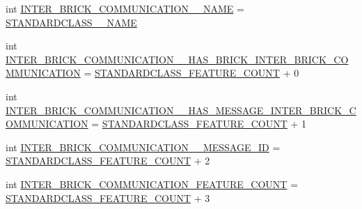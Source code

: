 \begin{DoxyCompactItemize}
\item 
int \hyperlink{interfaceshootingmachineemfmodel_1_1_shootingmachineemfmodel_package_abb5392d911aa5f7d4a788a7d7526f30b}{I\-N\-T\-E\-R\-\_\-\-B\-R\-I\-C\-K\-\_\-\-C\-O\-M\-M\-U\-N\-I\-C\-A\-T\-I\-O\-N\-\_\-\-\_\-\-N\-A\-M\-E} = \hyperlink{interfaceshootingmachineemfmodel_1_1_shootingmachineemfmodel_package_a06475d7d54d52ee19b2aaf4d5d73c738}{S\-T\-A\-N\-D\-A\-R\-D\-C\-L\-A\-S\-S\-\_\-\-\_\-\-N\-A\-M\-E}
\item 
int \hyperlink{interfaceshootingmachineemfmodel_1_1_shootingmachineemfmodel_package_a4c6fd564dd4ba2568a585c6dc93b72fc}{I\-N\-T\-E\-R\-\_\-\-B\-R\-I\-C\-K\-\_\-\-C\-O\-M\-M\-U\-N\-I\-C\-A\-T\-I\-O\-N\-\_\-\-\_\-\-H\-A\-S\-\_\-\-B\-R\-I\-C\-K\-\_\-\-I\-N\-T\-E\-R\-\_\-\-B\-R\-I\-C\-K\-\_\-\-C\-O\-M\-M\-U\-N\-I\-C\-A\-T\-I\-O\-N} = \hyperlink{interfaceshootingmachineemfmodel_1_1_shootingmachineemfmodel_package_a14037f66989b3107e402142df96ee9aa}{S\-T\-A\-N\-D\-A\-R\-D\-C\-L\-A\-S\-S\-\_\-\-F\-E\-A\-T\-U\-R\-E\-\_\-\-C\-O\-U\-N\-T} + 0
\item 
int \hyperlink{interfaceshootingmachineemfmodel_1_1_shootingmachineemfmodel_package_a573780dee8497e6d6e4aa6401c1e36fb}{I\-N\-T\-E\-R\-\_\-\-B\-R\-I\-C\-K\-\_\-\-C\-O\-M\-M\-U\-N\-I\-C\-A\-T\-I\-O\-N\-\_\-\-\_\-\-H\-A\-S\-\_\-\-M\-E\-S\-S\-A\-G\-E\-\_\-\-I\-N\-T\-E\-R\-\_\-\-B\-R\-I\-C\-K\-\_\-\-C\-O\-M\-M\-U\-N\-I\-C\-A\-T\-I\-O\-N} = \hyperlink{interfaceshootingmachineemfmodel_1_1_shootingmachineemfmodel_package_a14037f66989b3107e402142df96ee9aa}{S\-T\-A\-N\-D\-A\-R\-D\-C\-L\-A\-S\-S\-\_\-\-F\-E\-A\-T\-U\-R\-E\-\_\-\-C\-O\-U\-N\-T} + 1
\item 
int \hyperlink{interfaceshootingmachineemfmodel_1_1_shootingmachineemfmodel_package_a291f0af122b36942c2271b0c1b5fc389}{I\-N\-T\-E\-R\-\_\-\-B\-R\-I\-C\-K\-\_\-\-C\-O\-M\-M\-U\-N\-I\-C\-A\-T\-I\-O\-N\-\_\-\-\_\-\-M\-E\-S\-S\-A\-G\-E\-\_\-\-I\-D} = \hyperlink{interfaceshootingmachineemfmodel_1_1_shootingmachineemfmodel_package_a14037f66989b3107e402142df96ee9aa}{S\-T\-A\-N\-D\-A\-R\-D\-C\-L\-A\-S\-S\-\_\-\-F\-E\-A\-T\-U\-R\-E\-\_\-\-C\-O\-U\-N\-T} + 2
\item 
int \hyperlink{interfaceshootingmachineemfmodel_1_1_shootingmachineemfmodel_package_a8d13017baf2c20e1387a03aa9657d5ff}{I\-N\-T\-E\-R\-\_\-\-B\-R\-I\-C\-K\-\_\-\-C\-O\-M\-M\-U\-N\-I\-C\-A\-T\-I\-O\-N\-\_\-\-F\-E\-A\-T\-U\-R\-E\-\_\-\-C\-O\-U\-N\-T} = \hyperlink{interfaceshootingmachineemfmodel_1_1_shootingmachineemfmodel_package_a14037f66989b3107e402142df96ee9aa}{S\-T\-A\-N\-D\-A\-R\-D\-C\-L\-A\-S\-S\-\_\-\-F\-E\-A\-T\-U\-R\-E\-\_\-\-C\-O\-U\-N\-T} + 3

\end{DoxyCompactItemize}
